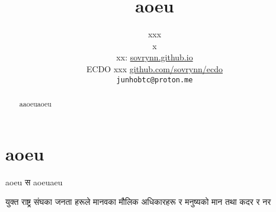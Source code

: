 \documentclass[10pt,twocolumn,letterpaper]{article}
\begin{document}
\title{aoeu}

\author{xxx\\
x\\
xx: \href{https://sovrynn.github.io}{sovrynn.github.io}\\
ECDO xxx \href{https://github.com/sovrynn/ecdo}{github.com/sovrynn/ecdo}\\
{\tt\small junhobtc@proton.me}
}

\maketitle

\begin{abstract}

aaoeuaoeu

\end{abstract}

\section{aoeu}

aoeu स aoeuaeu

युक्त राष्ट्र संघका जनता हरूले मानवका मौलिक अधिकारहरू र मनुष्यको मान तथा कदर र नर 

\clearpage
\twocolumn

{\small


}
\end{document}
